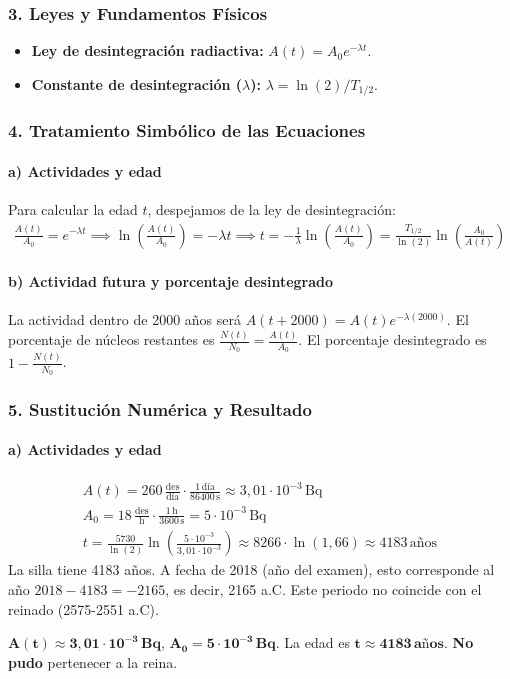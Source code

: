 \subsubsection*{3. Leyes y Fundamentos Físicos}
\begin{itemize}
    \item \textbf{Ley de desintegración radiactiva:} $A(t) = A_0 e^{-\lambda t}$.
    \item \textbf{Constante de desintegración ($\lambda$):} $\lambda = \ln(2)/T_{1/2}$.
\end{itemize}
\subsubsection*{4. Tratamiento Simbólico de las Ecuaciones}
\paragraph{a) Actividades y edad}
Para calcular la edad $t$, despejamos de la ley de desintegración:
\begin{gather}
    \frac{A(t)}{A_0} = e^{-\lambda t} \implies \ln\left(\frac{A(t)}{A_0}\right) = -\lambda t \implies t = -\frac{1}{\lambda}\ln\left(\frac{A(t)}{A_0}\right) = \frac{T_{1/2}}{\ln(2)}\ln\left(\frac{A_0}{A(t)}\right)
\end{gather}
\paragraph{b) Actividad futura y porcentaje desintegrado}
La actividad dentro de 2000 años será $A(t+2000)=A(t) e^{-\lambda (2000)}$.
El porcentaje de núcleos restantes es $\frac{N(t)}{N_0} = \frac{A(t)}{A_0}$. El porcentaje desintegrado es $1 - \frac{N(t)}{N_0}$.
\subsubsection*{5. Sustitución Numérica y Resultado}
\paragraph{a) Actividades y edad}
\begin{gather}
    A(t) = 260\,\frac{\text{des}}{\text{día}} \cdot \frac{1\,\text{día}}{86400\,\text{s}} \approx 3,01\cdot10^{-3}\,\text{Bq} \\
    A_0 = 18\,\frac{\text{des}}{\text{h}} \cdot \frac{1\,\text{h}}{3600\,\text{s}} = 5\cdot10^{-3}\,\text{Bq} \\
    t = \frac{5730}{\ln(2)}\ln\left(\frac{5\cdot10^{-3}}{3,01\cdot10^{-3}}\right) \approx 8266 \cdot \ln(1,66) \approx 4183\,\text{años}
\end{gather}
La silla tiene 4183 años. A fecha de 2018 (año del examen), esto corresponde al año $2018-4183 = -2165$, es decir, 2165 a.C. Este periodo no coincide con el reinado (2575-2551 a.C).
\begin{cajaresultado}
    $\boldsymbol{A(t)\approx 3,01\cdot10^{-3}\,\textbf{Bq}}$, $\boldsymbol{A_0 = 5\cdot10^{-3}\,\textbf{Bq}}$. La edad es $\boldsymbol{t\approx4183\,\textbf{años}}$. \textbf{No pudo} pertenecer a la reina.
\end{cajaresultado}
